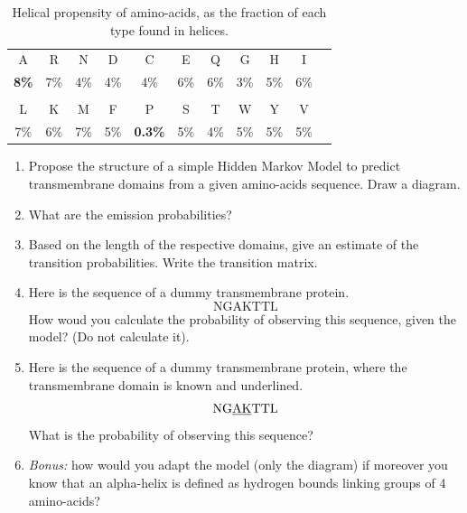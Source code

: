 \documentclass[a4paper,11pt]{article}
\begin{document}
\begin{table}[h]
 \caption{Helical propensity of amino-acids, as the fraction of each type found in helices.}
  \begin{center}
    \begin{tabular}{ cccccccccc c }
      A & R & N & D & C & E & Q & G & H & I \\
      \bf{8\%} & 7\% & 4\% & 4\% & 4\% & 6\% & 6\% & 3\% & 5\% & 6\% \\
    \\
      L & K & M & F & P & S & T & W & Y & V \\
      7\% & 6\% & 7\% & 5\% & \bf{0.3\%} & 5\% & 4\% & 5\% & 5\% & 5\% \\
    \end{tabular}
  \end{center}
\end{table}


\begin{enumerate}%
\item Propose the structure of a simple Hidden Markov Model to predict transmembrane domains 
from a given amino-acids sequence. Draw a diagram.
\item What are the emission probabilities?
\item Based on the length of the respective domains, give an estimate of the transition probabilities. Write the transition matrix.
\item Here is the sequence of a dummy transmembrane protein.
$$\mbox{NGAKTTL}$$
How woud you calculate the probability of observing this sequence, given the model? (Do not calculate it).

\item Here is the sequence of a dummy transmembrane protein, where the transmembrane domain
is known and underlined.
$$\mbox{NG\underline{AK}TTL}$$
What is the probability of observing this sequence? 

\item \textit{Bonus:} how would you adapt the model (only the diagram) if moreover you know that an alpha-helix is defined as 
hydrogen bounds linking groups of 4 amino-acids?
\end{enumerate}
\end{document}
